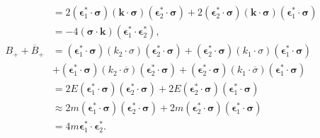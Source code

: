 \begin{align}
\begin{split}
    &= 2(\boldsymbol{\epsilon}_1^\ast \cdot \boldsymbol\sigma)(\boldsymbol{k}\cdot\boldsymbol\sigma)(\boldsymbol{\epsilon}_2^\ast \cdot \boldsymbol\sigma)
    + 2(\boldsymbol{\epsilon}_2^\ast \cdot \boldsymbol\sigma)(\boldsymbol{k}\cdot\boldsymbol\sigma)(\boldsymbol{\epsilon}_1^\ast \cdot \boldsymbol\sigma) \\
    &= -4(\boldsymbol\sigma \cdot \boldsymbol{k})(\boldsymbol{\epsilon}_1^\ast \cdot \boldsymbol{\epsilon}_2^\ast) , \\
    B_+ + \overline{B}_+ &= (\boldsymbol{\epsilon}_1^\ast \cdot \boldsymbol\sigma)(k_2 \cdot \sigma)(\boldsymbol{\epsilon}_2^\ast \cdot \boldsymbol\sigma)
    + (\boldsymbol{\epsilon}_2^\ast \cdot \boldsymbol\sigma)(k_1 \cdot \sigma)(\boldsymbol{\epsilon}_1^\ast \cdot \boldsymbol\sigma) \\
    &+ (\boldsymbol{\epsilon}_1^\ast \cdot \boldsymbol\sigma)(k_2 \cdot \overline\sigma)(\boldsymbol{\epsilon}_2^\ast \cdot \boldsymbol\sigma)
    + (\boldsymbol{\epsilon}_2^\ast \cdot \boldsymbol\sigma)(k_1 \cdot \overline\sigma)(\boldsymbol{\epsilon}_1^\ast \cdot \boldsymbol\sigma) \\
    &= 2E(\boldsymbol{\epsilon}_1^\ast \cdot \boldsymbol\sigma)(\boldsymbol{\epsilon}_2^\ast \cdot \boldsymbol\sigma) + 2E(\boldsymbol{\epsilon}_2^\ast \cdot \boldsymbol\sigma)(\boldsymbol{\epsilon}_1^\ast \cdot \boldsymbol\sigma) \\
    &\approx 2m (\boldsymbol{\epsilon}_1^\ast \cdot \boldsymbol\sigma)(\boldsymbol{\epsilon}_2^\ast \cdot \boldsymbol\sigma) + 2m(\boldsymbol{\epsilon}_2^\ast \cdot \boldsymbol\sigma)(\boldsymbol{\epsilon}_1^\ast \cdot \boldsymbol\sigma) \\
    &= 4m \boldsymbol{\epsilon}_1^\ast \cdot \boldsymbol{\epsilon}_2^\ast .
  \end{split}
  \label{prob5_4b_BBB}
\end{align}

